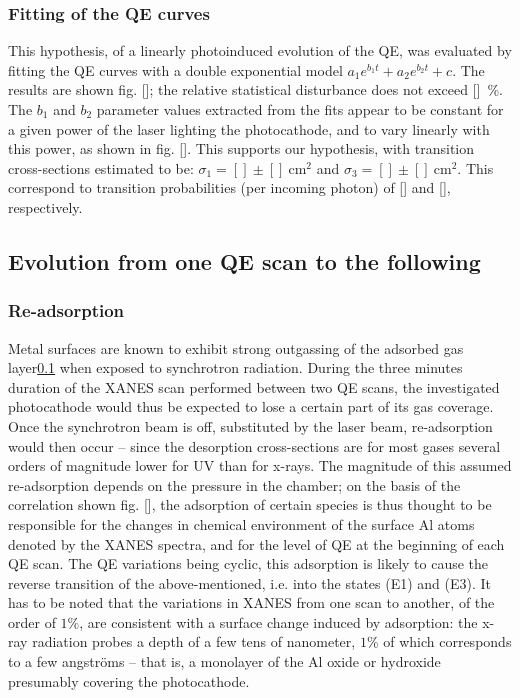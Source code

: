 \documentclass[aip,graphicx]{revtex4-1}
\begin{document}
\subsubsection*{Fitting of the QE curves}
This hypothesis, of a linearly photoinduced evolution of the QE, was evaluated by fitting the QE curves with a double exponential model $a_1e^{b_1t}+a_2e^{b_2t}+c$. The results are shown fig. []; the relative statistical disturbance does not exceed []~\%. The $b_1$ and $b_2$ parameter values extracted from the fits appear to be constant for a given power of the laser lighting the photocathode, and to vary linearly with this power, as shown in fig. []. This supports our hypothesis, with transition cross-sections estimated to be: $\sigma_1=[]\pm[]~\mbox{cm}^2$ and $\sigma_3=[]\pm[]~\mbox{cm}^2$. This correspond to transition probabilities (per incoming photon) of [] and [], respectively. 

\subsection{Evolution from one QE scan to the following}

\subsubsection*{Re-adsorption}
Metal surfaces are known to exhibit strong outgassing of the adsorbed gas layer\ref{} when exposed to synchrotron radiation. During the three minutes duration of the XANES scan performed between two QE scans, the investigated photocathode would thus be expected to lose a certain part of its gas coverage. Once the synchrotron beam is off, substituted by the laser beam, re-adsorption would then occur -- since the desorption cross-sections are for most gases several orders of magnitude lower for UV than for x-rays. The magnitude of this assumed re-adsorption depends on the pressure in the chamber; on the basis of the correlation shown fig. [], the adsorption of certain species is thus thought to be responsible for the changes in chemical environment of the surface Al atoms denoted by the XANES spectra, and for the level of QE at the beginning of each QE scan. The QE variations being cyclic, this adsorption is likely to cause the reverse transition of the above-mentioned, i.e. into the states (E1) and (E3).
It has to be noted that the variations in XANES from one scan to another, of the order of $1\%$, are consistent with a surface change induced by adsorption: the x-ray radiation probes a depth of a few tens of nanometer, $1\%$ of which corresponds to a few angstr\"{o}ms -- that is, a monolayer of the Al oxide or hydroxide presumably covering the photocathode.
\end{document}
